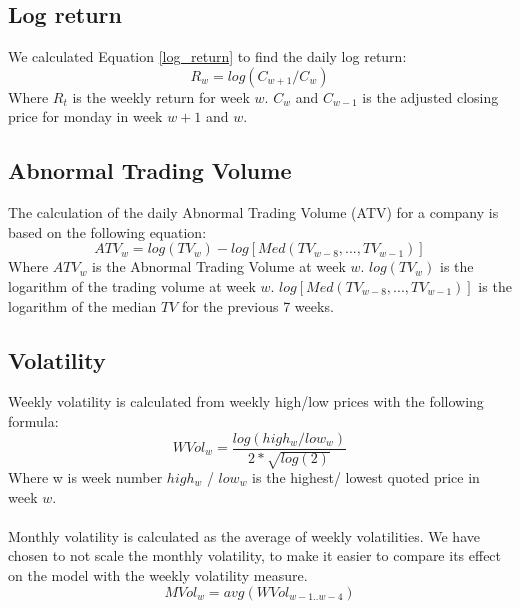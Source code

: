 \subsection{Log return}
We calculated Equation \eqref{log_return} to find the daily log return:
\begin{equation}
   \label{log_return} 
   R_w = log (C_{w+1}/C_{w}) 
\end{equation}
Where $R_t$ is the weekly return for week $w$. $C_w$ and  $C_{w-1}$ is the adjusted closing price for monday in week $w+1$ and $w$. 

\subsection{Abnormal Trading Volume}
The calculation of the daily Abnormal Trading Volume (ATV) for a company is based on the following equation: 
\begin{equation}
   \label{abnormal_volume} 
   ATV_{w} = log(TV_{w}) - log[Med(TV_{w-8},...,TV_{w-1})] 
\end{equation}
   Where $ATV_w$ is the Abnormal Trading Volume at week $w$. $log(TV_{w})$ is the logarithm of the trading volume at week $w$. $log[Med(TV_{w-8},...,TV_{w-1})]$ is the logarithm of the median $TV$ for the previous 7 weeks.


\subsection{Volatility}
Weekly volatility is calculated from weekly high/low prices with the following formula:
\begin{equation}
   \label{w_volatility} 
   WVol_{w} = \frac{log(high_w/low_w)}{2*\sqrt{log(2)}} 
\end{equation}
Where w is week number $high_w$ / $low_w$ is the highest/ lowest quoted price in week $w$.
\\\\
Monthly volatility is calculated as the average of weekly volatilities. We have chosen to not scale the monthly volatility, to make it easier to compare its effect on the model with the weekly volatility measure.
\begin{equation}
   \label{m_volatility} 
   MVol_{w} = avg( WVol_{w-1..w-4}) 
\end{equation}
